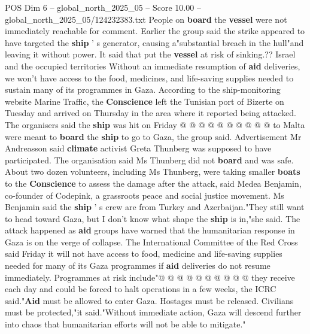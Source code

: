 \begin{textsample}{POS Dim 6 – global\_north\_2025\_05 – Score 10.00 – global\_north\_2025\_05/124232383.txt}
People on \textbf{board} the \textbf{vessel} were not immediately reachable for comment.
Earlier the group said the strike appeared to have targeted the \textbf{ship} ' s generator, causing a"substantial breach in the hull"and leaving it without power.
It said that put the \textbf{vessel} at risk of sinking.??
Israel and the occupied territories Without an immediate resumption of \textbf{aid} deliveries, we won't have access to the food, medicines, and life-saving supplies needed to sustain many of its programmes in Gaza.
According to the ship-monitoring website Marine Traffic, the \textbf{Conscience} left the Tunisian port of Bizerte on Tuesday and arrived on Thursday in the area where it reported being attacked.
The organisers said the \textbf{ship} was hit on Friday @ @ @ @ @ @ @ @ @ @ to Malta were meant to \textbf{board} the \textbf{ship} to go to Gaza, the group said.
Advertisement Mr Andreasson said \textbf{climate} activist Greta Thunberg was supposed to have participated.
The organisation said Ms Thunberg did not \textbf{board} and was safe.
About two dozen volunteers, including Ms Thunberg, were taking smaller \textbf{boats} to the \textbf{Conscience} to assess the damage after the attack, said Medea Benjamin, co-founder of Codepink, a grassroots peace and social justice movement.
Ms Benjamin said the \textbf{ship} ' s crew are from Turkey and Azerbaijan."They still want to head toward Gaza, but I don't know what shape the \textbf{ship} is in,"she said.
The attack happened as \textbf{aid} groups have warned that the humanitarian response in Gaza is on the verge of collapse.
The International Committee of the Red Cross said Friday it will not have access to food, medicine and life-saving supplies needed for many of its Gaza programmes if \textbf{aid} deliveries do not resume immediately.
Programmes at risk include"@ @ @ @ @ @ @ @ @ @ they receive each day and could be forced to halt operations in a few weeks, the ICRC said."\textbf{Aid} must be allowed to enter Gaza.
Hostages must be released.
Civilians must be protected,"it said."Without immediate action, Gaza will descend further into chaos that humanitarian efforts will not be able to mitigate."

\end{textsample}
